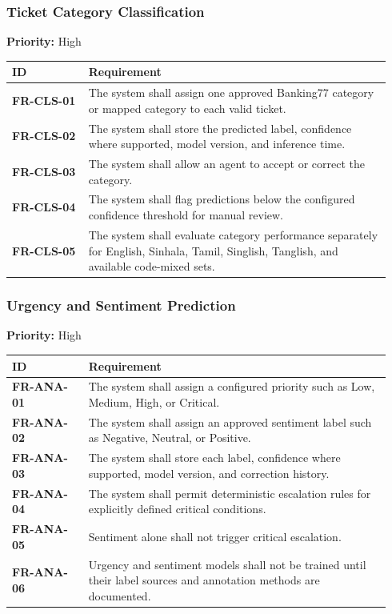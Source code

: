 \documentclass[10pt,letterpaper]{article}
\newcommand{\req}[1]{\textbf{#1}}
\newcommand{\priority}[1]{\textbf{Priority:} #1}
\newenvironment{requirements}{%
  \small\setlength{\tabcolsep}{4pt}%
  \begin{longtable}{|L{0.19\linewidth}|L{0.75\linewidth}|}
  \hline\textbf{ID} & \textbf{Requirement}\\\hline\endhead}{\hline\end{longtable}}
\newenvironment{templatebody}{\par\justifying\setlength{\emergencystretch}{3em}}{\par}
\begin{document}
\begin{templatebody}
\subsubsection{Ticket Category Classification}
\priority{High}
\begin{requirements}
\req{FR-CLS-01} & The system shall assign one approved Banking77 category or mapped category to each valid ticket.\\
\req{FR-CLS-02} & The system shall store the predicted label, confidence where supported, model version, and inference time.\\
\req{FR-CLS-03} & The system shall allow an agent to accept or correct the category.\\
\req{FR-CLS-04} & The system shall flag predictions below the configured confidence threshold for manual review.\\
\req{FR-CLS-05} & The system shall evaluate category performance separately for English, Sinhala, Tamil, Singlish, Tanglish, and available code-mixed sets.\\
\end{requirements}

\subsubsection{Urgency and Sentiment Prediction}
\priority{High}
\begin{requirements}
\req{FR-ANA-01} & The system shall assign a configured priority such as Low, Medium, High, or Critical.\\
\req{FR-ANA-02} & The system shall assign an approved sentiment label such as Negative, Neutral, or Positive.\\
\req{FR-ANA-03} & The system shall store each label, confidence where supported, model version, and correction history.\\
\req{FR-ANA-04} & The system shall permit deterministic escalation rules for explicitly defined critical conditions.\\
\req{FR-ANA-05} & Sentiment alone shall not trigger critical escalation.\\
\req{FR-ANA-06} & Urgency and sentiment models shall not be trained until their label sources and annotation methods are documented.\\
\end{requirements}


\end{templatebody}
\end{document}

